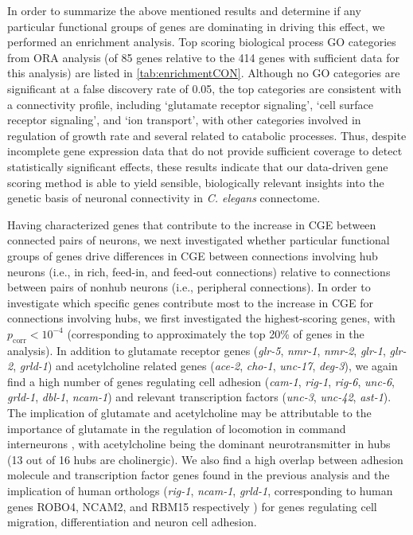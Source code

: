 {In order to summarize the above mentioned results and determine if any particular functional groups of genes are dominating in driving this effect, we performed an enrichment analysis.
Top scoring biological process GO categories from ORA analysis (of 85 genes relative to the 414 genes with sufficient data for this analysis) are listed in \ref{tab:enrichmentCON}.
Although no GO categories are significant at a false discovery rate of 0.05, the top categories are consistent with a connectivity profile, including `glutamate receptor signaling', `cell surface receptor signaling', and `ion transport', with other categories involved in regulation of growth rate and several related to catabolic processes.
Thus, despite incomplete gene expression data that do not provide sufficient coverage to detect statistically significant effects, these results indicate that our data-driven gene scoring method is able to yield sensible, biologically relevant insights into the genetic basis of neuronal connectivity in \textit{C. elegans} connectome.

Having characterized genes that contribute to the increase in CGE between connected pairs of neurons, we next investigated whether particular functional groups of genes drive differences in CGE between connections involving hub neurons (i.e., in rich, feed-in, and feed-out connections) relative to connections between pairs of nonhub neurons (i.e., peripheral connections).
In order to investigate which specific genes contribute most to the increase in CGE for connections involving hubs, we first investigated the highest-scoring genes, with $p_\mathrm{corr} < 10^{-4}$ (corresponding to approximately the top 20\% of genes in the analysis).
In addition to glutamate receptor genes (\emph{glr-5}, \emph{nmr-1}, \emph{nmr-2}, \emph{glr-1}, \emph{glr-2}, \emph{grld-1})
and acetylcholine related genes (\emph{ace-2}, \emph{cho-1}, \emph{unc-17}, \emph{deg-3}),
we again find a high number of genes regulating cell adhesion (\emph{cam-1}, \emph{rig-1}, \emph{rig-6}, \emph{unc-6}, \emph{grld-1}, \emph{dbl-1}, \emph{ncam-1})
and relevant transcription factors (\emph{unc-3}, \emph{unc-42}, \emph{ast-1}).
The implication of glutamate and acetylcholine may be attributable to the importance of glutamate in the regulation of locomotion in command interneurons \citep{Choi2015, Zheng1999}, with acetylcholine being the dominant neurotransmitter in hubs (13 out of 16 hubs are cholinergic).
We also find a high overlap between adhesion molecule and transcription factor genes found in the previous analysis and the implication of human orthologs (\emph{rig-1}, \emph{ncam-1}, \emph{grld-1}, corresponding to human genes ROBO4, NCAM2, and RBM15 respectively  \citep{Harris2010}) for genes regulating cell migration, differentiation and neuron cell adhesion.

}
